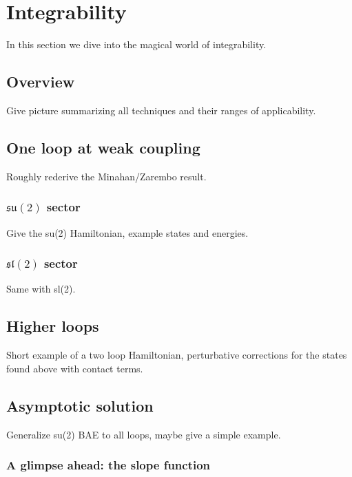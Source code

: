 
\section{Integrability}

In this section we dive into the magical world of integrability.

\subsection{Overview}

Give picture summarizing all techniques and their ranges of applicability.

\subsection{One loop at weak coupling}

Roughly rederive the Minahan/Zarembo result.

\subsubsection{$\mathfrak{su}(2)$ sector}

Give the su(2) Hamiltonian, example states and energies.

\subsubsection{$\mathfrak{sl}(2)$ sector}

Same with sl(2).

\subsection{Higher loops}

Short example of a two loop Hamiltonian, perturbative corrections for the states found above with contact terms.

\subsection{Asymptotic solution}

Generalize su(2) BAE to all loops, maybe give a simple example. 

\subsubsection{A glimpse ahead: the slope function}

